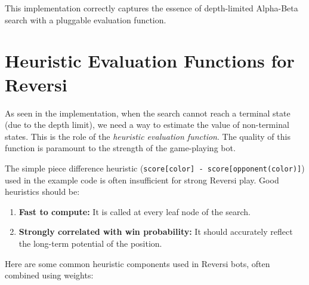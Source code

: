 \documentclass[11pt]{article}
\begin{document}
This implementation correctly captures the essence of depth-limited Alpha-Beta search with a pluggable evaluation function.

\section{Heuristic Evaluation Functions for Reversi}

As seen in the implementation, when the search cannot reach a terminal state (due to the depth limit), we need a way to estimate the value of non-terminal states. This is the role of the \textit{heuristic evaluation function}. The quality of this function is paramount to the strength of the game-playing bot.

The simple piece difference heuristic (\texttt{score[color] - score[opponent(color)]}) used in the example code is often insufficient for strong Reversi play. Good heuristics should be:
\begin{enumerate}
    \item \textbf{Fast to compute:} It is called at every leaf node of the search.
    \item \textbf{Strongly correlated with win probability:} It should accurately reflect the long-term potential of the position.
\end{enumerate}

Here are some common heuristic components used in Reversi bots, often combined using weights:
\end{document}
